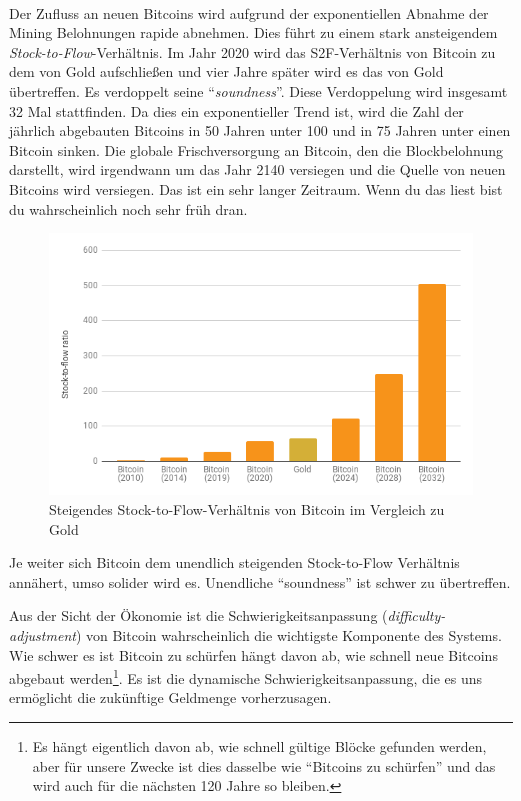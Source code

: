 \paragraph{}
Der Zufluss an neuen Bitcoins wird aufgrund der exponentiellen Abnahme der
Mining Belohnungen rapide abnehmen. Dies führt zu einem stark ansteigendem
\textit{Stock-to-Flow}-Verhältnis. Im Jahr 2020 wird das S2F-Verhältnis von Bitcoin
zu dem von Gold aufschließen und vier Jahre später wird es das von Gold übertreffen. Es
verdoppelt seine \enquote{\textit{soundness}}. Diese Verdoppelung wird insgesamt
32 Mal stattfinden. Da dies ein exponentieller Trend ist, wird die Zahl der
jährlich abgebauten Bitcoins in 50 Jahren unter 100 und in 75 Jahren
unter einen Bitcoin sinken. Die globale Frischversorgung an Bitcoin, den die
Blockbelohnung darstellt, wird irgendwann um das Jahr 2140 versiegen und die
Quelle von neuen Bitcoins wird versiegen. Das ist ein sehr langer Zeitraum. Wenn
du das liest bist du wahrscheinlich noch sehr früh dran.

\begin{figure}
  \includegraphics{assets/images/soundness-over-time.png}
  \caption{Steigendes Stock-to-Flow-Verhältnis von Bitcoin im Vergleich zu Gold}
  \label{fig:soundness-over-time}
\end{figure}

Je weiter sich Bitcoin dem unendlich steigenden Stock-to-Flow Verhältnis
annähert, umso solider wird es. Unendliche \enquote{soundness} ist schwer zu
übertreffen.

Aus der Sicht der Ökonomie ist die Schwierigkeitsanpassung
(\textit{difficulty-adjustment}) von Bitcoin wahrscheinlich die wichtigste
Komponente des Systems. Wie schwer es ist Bitcoin zu schürfen hängt davon ab,
wie schnell neue Bitcoins abgebaut werden\footnote{Es hängt eigentlich davon ab,
wie schnell gültige Blöcke gefunden werden, aber für unsere Zwecke ist dies
dasselbe wie \enquote{Bitcoins zu schürfen} und das wird auch für die nächsten
120 Jahre so bleiben.}. Es ist die dynamische Schwierigkeitsanpassung, die es
uns ermöglicht die zukünftige Geldmenge vorherzusagen.

